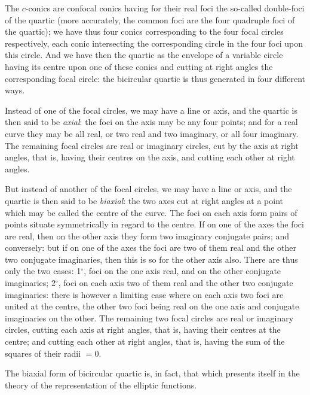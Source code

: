 \documentclass[11pt,a4paper]{article}
\begin{document}
The $c$-conics are confocal conics having for their real foci the so-called double-foci of the quartic (more accurately, the common foci are the four quadruple foci of the quartic); we have thus four conics corresponding to the four focal circles respectively, each conic intersecting the corresponding circle in the four foci upon this circle. And we have then the quartic as the envelope of a variable circle having its centre upon one of these conics and cutting at right angles the corresponding focal circle: the bicircular quartic is thus generated in four different ways.

Instead of one of the focal circles, we may have a line or axis, and the quartic is then said to be \emph{axial}: the foci on the axis may be any four points; and for a real curve they may be all real, or two real and two imaginary, or all four imaginary. The remaining focal circles are real or imaginary circles, cut by the axis at right angles, that is, having their centres on the axis, and cutting each other at right angles.

But instead of another of the focal circles, we may have a line or axis, and the quartic is then said to be \emph{biaxial}: the two axes cut at right angles at a point which may be called the centre of the curve. The foci on each axis form pairs of points situate symmetrically in regard to the centre. If on one of the axes the foci are real, then on the other axis they form two imaginary conjugate pairs; and conversely: but if on one of the axes the foci are two of them real and the other two conjugate imaginaries, then this is so for the other axis also. There are thus only the two cases: 1$^\circ$, foci on the one axis real, and on the other conjugate imaginaries; 2$^\circ$, foci on each axis two of them real and the other two conjugate imaginaries: there is however a limiting case where on each axis two foci are united at the centre, the other two foci being real on the one axis and conjugate imaginaries on the other. The remaining two focal circles are real or imaginary circles, cutting each axis at right angles, that is, having their centres at the centre; and cutting each other at right angles, that is, having the sum of the squares of their radii $= 0$.

The biaxial form of bicircular quartic is, in fact, that which presents itself in the theory of the representation of the elliptic functions.
\end{document}
